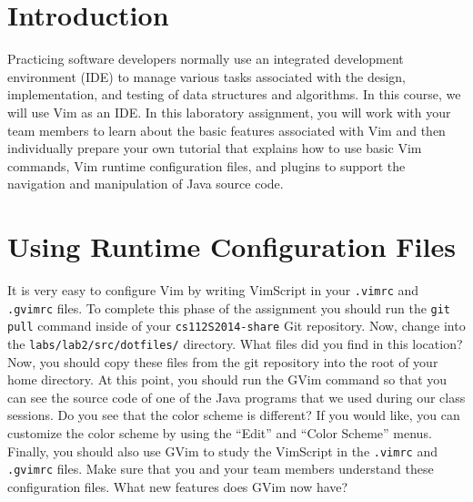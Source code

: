 


\usepackage[compact]{titlesec}



\section*{Introduction}

Practicing software developers normally use an integrated development environment (IDE) to manage various tasks associated with
the design, implementation, and testing of data structures and algorithms. In this course, we will use Vim as an IDE.  In this
laboratory assignment, you will work with your team members to learn about the basic features associated with Vim and then
individually prepare your own tutorial that explains how to use basic Vim commands, Vim runtime configuration files, and plugins
to support the navigation and manipulation of Java source code. 

\section*{Using Runtime Configuration Files}

It is very easy to configure Vim by writing VimScript in your {\tt .vimrc} and {\tt .gvimrc} files.  To complete this phase of the
assignment you should run the {\tt git pull} command inside of your {\tt cs112S2014-share} Git repository.  Now, change into the
{\tt labs/lab2/src/dotfiles/} directory.  What files did you find in this location? Now, you should copy these files from the git
repository into the root of your home directory. At this point, you should run the GVim command so that you can see the source
code of one of the Java programs that we used during our class sessions. Do you see that the color scheme is different? If you
would like, you can customize the color scheme by using the ``Edit'' and ``Color Scheme'' menus.  Finally, you should also use
GVim to study the VimScript in the {\tt .vimrc} and {\tt .gvimrc} files.  Make sure that you and your team members understand
these configuration files. What new features does GVim now have?


